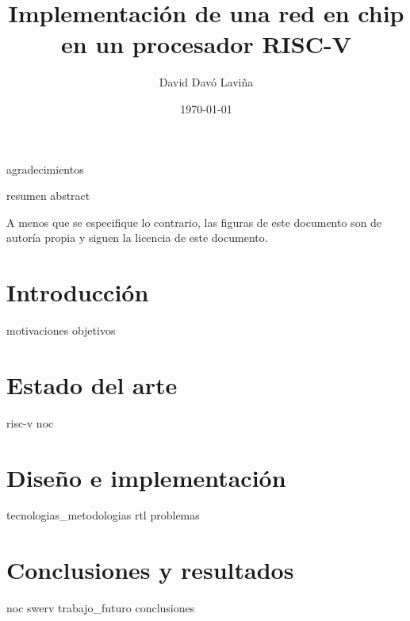 \documentclass[titlepage]{tfg-ucm}
\title{Implementación de una red en chip en un procesador RISC-V}
\author{David Davó Laviña}
\date{\today}
\begin{document}
\frontmatter
\makecover


{agradecimientos}

{resumen}
{abstract}

\setcounter{tocdepth}{1}
\tableofcontents

    \listoffigures
    A menos que se especifique lo contrario, las figuras de este documento son de autoría propia y siguen la licencia de este documento.
    \listoftables

\mainmatter
\part{Introducción}
{motivaciones}
{objetivos}

\part{Estado del arte}
{risc-v}
{noc}

\part{Diseño e implementación}
% 
{tecnologias_metodologias}
{rtl}
{problemas}

\part{Conclusiones y resultados}
{noc}
{swerv}
{trabajo_futuro}
{conclusiones}


\nocite{Kamali2015TowardsArchitectures}
\nocite{DeMicheli2006NetworksTools}
\nocite{Jantsch2003NetworksChip}
\nocite{Asanovic2014InstructionRISC-V}
\nocite{Chen2016RISC-VGeneology}
\printbibliography


\end{document}

